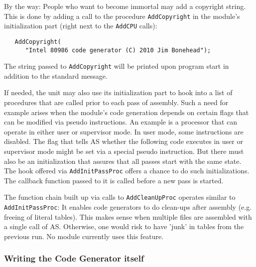 \documentclass[12pt,twoside]{report}
\newcommand{\tty}[1]{{\tt #1}}
\newcommand{\asname}{{AS}}
\begin{document}
By the way: People who want to become immortal may add a copyright
string.  This is done by adding a call to the procedure \tty{AddCopyright}
in the module's initialization part (right next to the \tty{AddCPU} calls):
\begin{verbatim}
   AddCopyright(
      "Intel 80986 code generator (C) 2010 Jim Bonehead");
\end{verbatim}
The string passed to \tty{AddCopyright} will be printed upon program start
in addition to the standard message.

If needed, the unit may also use its initialization part to hook into
a list of procedures that are called prior to each pass of assembly.
Such a need for example arises when the module's code generation
depends on certain flags that can be modified via pseudo
instructions.  An example is a processor that can operate in either
user or supervisor mode.  In user mode, some instructions are
disabled.  The flag that tells \asname{} whether the following code executes
in user or supervisor mode might be set via a special pseudo
instruction.  But there must also be an initialization that assures
that all passes start with the same state.  The hook offered via
\tty{AddInitPassProc} offers a chance to do such initializations.  The
callback function passed to it is called before a new pass is
started.

The function chain built up via calls to \tty{AddCleanUpProc}
operates similar to \tty{AddInitPassProc}: It enables code
generators to do clean-ups after assembly (e.g.  freeing of
literal tables).  This makes sense when multiple files are
assembled with a single call of \asname{}.  Otherwise, one would risk to
have 'junk' in tables from the previous run.  No module currently
uses this feature.

\subsubsection{Writing the Code Generator itself}
\end{document}

